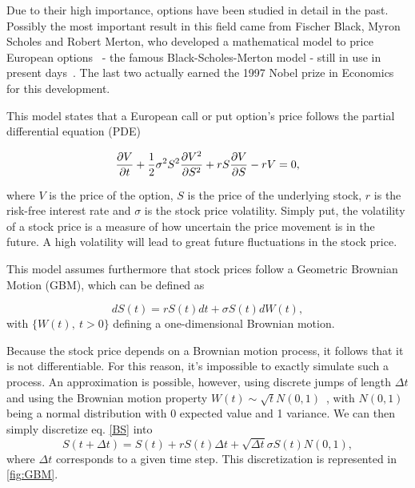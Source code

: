 \documentclass[a4paper,twocolumn,aps,prd,longbibliography,superscriptaddress]{revtex4-1}
\begin{document}
Due to their high importance, options have been studied in detail in the past.
Possibly the most important result in this field came from Fischer Black, Myron Scholes and Robert Merton, who developed a mathematical model to price European options~\cite{Scholes} - the famous Black-Scholes-Merton model - still in use in present days~\cite{Hull}. The last two actually earned the 1997 Nobel prize in Economics for this development.

This model states that a European call or put option's price follows the partial differential equation (PDE)

\begin{equation}\label{BS2}
\pdv{V}{t}+\frac{1}{2}\sigma^2S^2\pdv{V^2}{S^2}+rS\pdv{V}{S}-rV=0,
\end{equation}

\noindent where $V$ is the price of the option, $S$ is the price of the underlying stock, $r$ is the risk-free interest rate and $\sigma$ is the stock price volatility.
Simply put, the volatility of a stock price is a measure of how uncertain the price movement is in the future. A high volatility will lead to great future fluctuations in the stock price.

This model assumes furthermore that stock prices follow a Geometric Brownian Motion (GBM), which can be defined as

\begin{equation}\label{BS}
dS(t)=rS(t)dt+\sigma S(t)dW(t),
\end{equation}
\noindent with $\{W(t),\ t>0\}$ defining a one-dimensional Brownian motion.

Because the stock price depends on a Brownian motion process, it follows that it is not differentiable. For this reason, it's impossible to exactly simulate such a process. An approximation is possible, however, using discrete jumps of length $\Delta t$ and using the Brownian motion property $W(t)\sim \sqrt{t}N(0,1)$~\cite{Mikosch}, with $N(0,1)$ being a normal distribution with 0 expected value and 1 variance.
We can then simply discretize eq. \eqref{BS} into
\begin{equation}
S(t+\Delta t)=S(t)+rS(t)\Delta t+\sqrt{\Delta t}\sigma S(t)N(0,1),
\end{equation}
\noindent where $\Delta t$ corresponds to a given time step. This discretization is represented in \autoref{fig:GBM}.
\end{document}
